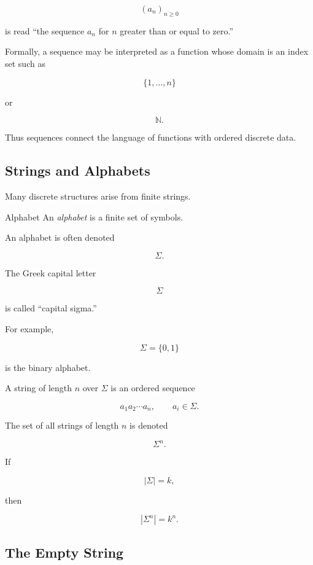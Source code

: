 \[
(a_n)_{n\geq0}
\]

is read ``the sequence \(a_n\) for \(n\) greater than or equal to
zero.''

Formally, a sequence may be interpreted as a function whose domain is
an index set such as

\[
\{1,\ldots,n\}
\]

or

\[
\mathbb{N}.
\]

Thus sequences connect the language of functions with ordered discrete
data.

\subsection{Strings and Alphabets}
\label{subsec:strings-alphabets}

Many discrete structures arise from finite strings.

\begin{definitionbox}{Alphabet}
An \emph{alphabet} is a finite set of symbols.
\end{definitionbox}

An alphabet is often denoted

\[
\Sigma.
\]

The Greek capital letter

\[
\Sigma
\]

is called ``capital sigma.''

For example,

\[
\Sigma=\{0,1\}
\]

is the binary alphabet.

A string of length \(n\) over \(\Sigma\) is an ordered sequence

\[
\boxed{
a_1a_2\cdots a_n,
\qquad
a_i\in\Sigma.
}
\]

The set of all strings of length \(n\) is denoted

\[
\boxed{
\Sigma^n.
}
\]

If

\[
|\Sigma|=k,
\]

then

\[
\boxed{
|\Sigma^n|=k^n.
}
\]

\subsection{The Empty String}
\label{subsec:empty-string}

